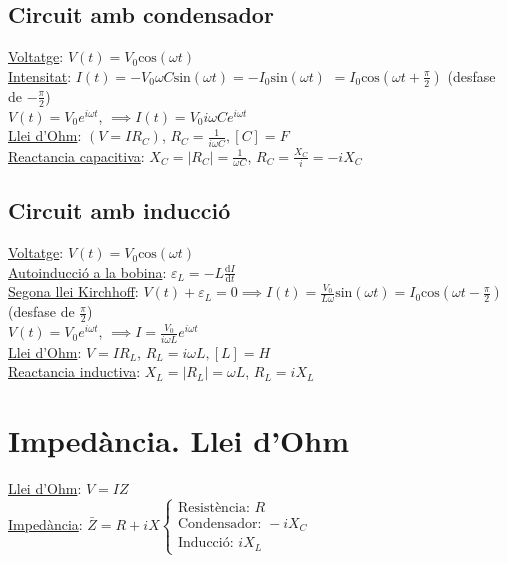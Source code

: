 \documentclass[12pt]{article}
\begin{document}
\begin{multicols}{4}
\subsection{Circuit amb condensador}

\underline{Voltatge}: $V(t) = V_0\text{cos}(\omega t)$ \\
\underline{Intensitat}: $I(t) = -V_0\omega C \text{sin}(\omega t) = -I_0\text{sin}(\omega t)$ $= I_0\text{cos}(\omega t + \frac{\pi}{2})$ (desfase de $-\frac{\pi}{2}$) \\
$V(t) = V_0 e^{i\omega t}$, $\implies I(t) = V_0i\omega Ce^{i\omega t}$ \\
\underline{Llei d'Ohm}: $(V=IR_C)$, $R_C = \frac{1}{i\omega C}, [C] = F$ \\
\underline{Reactancia capacitiva}: $X_C = \vert R_C\vert = \frac{1}{\omega C}$, $R_C = \frac{X_C}{i} = -iX_C$

\subsection{Circuit amb inducció}

\underline{Voltatge}: $V(t) = V_0\text{cos}(\omega t)$ \\
\underline{Autoinducció a la bobina}: $\varepsilon_L = -L \frac{\text{d}I}{\text{d}t}$ \\
\underline{Segona llei Kirchhoff}: $V(t) + \varepsilon_L = 0 \implies I(t) = \frac{V_0}{L\omega}\text{sin}(\omega t) = I_0\text{cos}(\omega t - \frac{\pi}{2})$ (desfase de $\frac{\pi}{2}$) \\
$V(t) = V_0e^{i\omega t}$, $\implies I = \frac{V_0}{i\omega L}e^{i\omega t}$ \\
\underline{Llei d'Ohm}: $V=IR_L$, $R_L=i\omega L, [L] = H$ \\
\underline{Reactancia inductiva}: $X_L = \vert R_L\vert = \omega L$, $R_L = iX_L$

\section{Impedància. Llei d'Ohm}

\underline{Llei d'Ohm}: $V = IZ$ \\
\underline{Impedància}: $\bar{Z} = R + iX \begin{cases} \text{Resistència: } R \\ \text{Condensador: } -iX_C \\ \text{Inducció: } iX_L \end{cases}$


\end{multicols}
\end{document}
